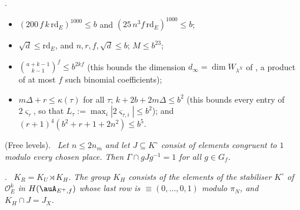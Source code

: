 \documentclass[10pt]{amsart}
\theoremstyle{definition}
\theoremstyle{remark}
\providecommand{\anrd}{\mathrm{rd}}
\providecommand{\auO}{\mathcal O}
\newenvironment{quotedthm}[2]{\par\medskip\noindent\begingroup
  \textbf{#1}#2.\ \itshape\ignorespaces}{\endgroup\par\medskip}
\begin{document}
\begin{quotedthm}{\cite[Lemma~13.4]{P46}}{}
\begin{enumerate}
\begin{itemize}
\item[(d)] $(200\,f\,k\,\anrd_E)^{1000}\le b$ and $(25\,n^{3}f\,\anrd_E)^{1000}\le b$;
\item[(e)] $\sqrt d\le\anrd_E$, and $n,r,f,\sqrt d\le b$; $M\le b^{23}$;
\item[(f)] $\binom{a+k-1}{k-1}^{f}\le b^{2kf}$ (this bounds the dimension $d_\infty=\dim W_{\lambda^X}$ of
{\cite[\S14.3]{P46}}, a product of at most $f$ such binomial coefficients);
\item[(g)] $m\Delta+r\le\kappa(\tau)$ for all $\tau$; $k+2b+2m\Delta\le b^{2}$ (this bounds every
entry of $2\varsigma_\tau$, so that $L_\tau:=\max_i|2\varsigma_{\tau,i}|\le b^{2}$); and
$(r+1)^{4}(b^{2}+r+1+2n^{2})\le b^{5}$.
\end{itemize}
\end{enumerate}
\end{quotedthm}

\begin{quotedthm}{\cite[Lemma~14.5]{P46}}{ (Free levels)}
Let $n\le2n_m$ and let $J\subseteq K^\circ$ consist of elements congruent to $1$ modulo every
chosen place. Then $\Gamma\cap gJg^{-1}=1$ for all $g\in G_f$.
\end{quotedthm}

\begin{quotedthm}{\cite[Lemma~2.1]{P51}}{}
$K_R=K_U\rtimes K_H$. The group $K_H$ consists of the elements of the stabiliser $K^\circ$ of
$\auO_E^k$ in $H(\auA_{E^+,f})$ whose last row is $\equiv(0,\dots,0,1)$ modulo $\pi_N$, and
$K_H\cap J=J_X$.
\end{quotedthm}
\end{document}
